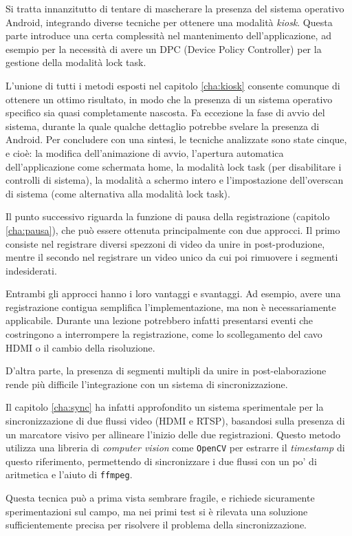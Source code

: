 Si tratta innanzitutto di tentare di mascherare la presenza del sistema operativo Android, integrando diverse tecniche per ottenere una modalità \emph{kiosk}. Questa parte introduce una certa complessità nel mantenimento dell'applicazione, ad esempio per la necessità di avere un DPC (Device Policy Controller) per la gestione della modalità lock task.

L'unione di tutti i metodi esposti nel capitolo \ref{cha:kiosk} consente comunque di ottenere un ottimo risultato, in modo che la presenza di un sistema operativo specifico sia quasi completamente nascosta. Fa eccezione la fase di avvio del sistema, durante la quale qualche dettaglio potrebbe svelare la presenza di Android. Per concludere con una sintesi, le tecniche analizzate sono state cinque, e cioè: la modifica dell'animazione di avvio, l'apertura automatica dell'applicazione come schermata home, la modalità lock task (per disabilitare i controlli di sistema), la modalità a schermo intero e l'impostazione dell'overscan di sistema (come alternativa alla modalità lock task).

Il punto successivo riguarda la funzione di pausa della registrazione (capitolo \ref{cha:pausa}), che può essere ottenuta principalmente con due approcci. Il primo consiste nel registrare diversi spezzoni di video da unire in post-produzione, mentre il secondo nel registrare un video unico da cui poi rimuovere i segmenti indesiderati.

Entrambi gli approcci hanno i loro vantaggi e svantaggi. Ad esempio, avere una registrazione contigua semplifica l'implementazione, ma non è necessariamente applicabile. Durante una lezione potrebbero infatti presentarsi eventi che costringono a interrompere la registrazione, come lo scollegamento del cavo HDMI o il cambio della risoluzione.

D'altra parte, la presenza di segmenti multipli da unire in post-elaborazione rende più difficile l'integrazione con un sistema di sincronizzazione.

Il capitolo \ref{cha:sync} ha infatti approfondito un sistema sperimentale per la sincronizzazione di due flussi video (HDMI e RTSP), basandosi sulla presenza di un marcatore visivo per allineare l'inizio delle due registrazioni. Questo metodo utilizza una libreria di \emph{computer vision} come \texttt{OpenCV} per estrarre il \emph{timestamp} di questo riferimento, permettendo di sincronizzare i due flussi con un po' di aritmetica e l'aiuto di \texttt{ffmpeg}.

Questa tecnica può a prima vista sembrare fragile, e richiede sicuramente sperimentazioni sul campo, ma nei primi test si è rilevata una soluzione sufficientemente precisa per risolvere il problema della sincronizzazione.

